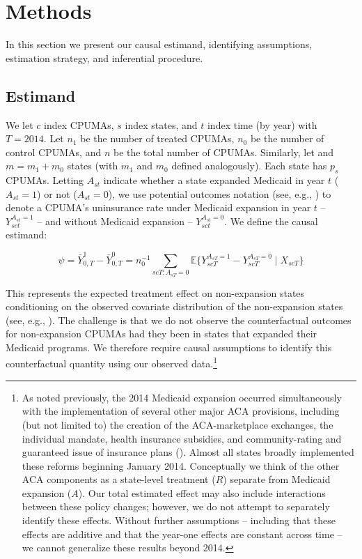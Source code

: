 \documentclass[aoas]{imsart}
\theoremstyle{plain}
\theoremstyle{remark}
\begin{document}
\section{Methods}\label{sec:methods}

In this section we present our causal estimand, identifying assumptions, estimation strategy, and inferential procedure.

\subsection{Estimand} \label{ssec:estimand}

We let $c$ index CPUMAs, $s$ index states, and $t$ index time (by year) with $T = 2014$. Let $n_1$ be the number of treated CPUMAs, $n_0$ be the number of control CPUMAs, and $n$ be the total number of CPUMAs. Similarly, let and $m = m_1 + m_0$ states (with $m_1$ and $m_0$ defined analogously). Each state has $p_s$ CPUMAs. Letting $A_{st}$ indicate whether a state expanded Medicaid in year $t$ ($A_{st} = 1$) or not ($A_{st} = 0$), we use potential outcomes notation (see, e.g., \cite{rubin2005causal}) to denote a CPUMA's uninsurance rate under Medicaid expansion in year $t$ -- $Y_{sct}^{A_{st} = 1}$ -- and without Medicaid expansion -- $Y_{sct}^{A_{st} = 0}$. We define the causal estimand:

\begin{equation}
\psi = \bar{Y}_{0, T}^1 - \bar{Y}_{0, T}^0 = n_0^{-1}\sum_{scT: A_{sT} = 0} \mathbb{E}\{Y_{scT}^{A_{sT} = 1} - Y_{scT}^{A_{sT} = 0} \mid X_{scT}\}
\end{equation}

This represents the expected treatment effect on non-expansion states conditioning on the observed covariate distribution of the non-expansion states (see, e.g., \cite{imbens2004nonparametric}). The challenge is that we do not observe the counterfactual outcomes for non-expansion CPUMAs had they been in states that expanded their Medicaid programs. We therefore require causal assumptions to identify this counterfactual quantity using our observed data.\footnote{As noted previously, the 2014 Medicaid expansion occurred simultaneously with the implementation of several other major ACA provisions, including (but not limited to) the creation of the ACA-marketplace exchanges, the individual mandate, health insurance subsidies, and community-rating and guaranteed issue of insurance plans (\cite{courtemanche2017early}). Almost all states broadly implemented these reforms beginning January 2014. Conceptually we think of the other ACA components as a state-level treatment ($R$) separate from Medicaid expansion ($A$). Our total estimated effect may also include interactions between these policy changes; however, we do not attempt to separately identify these effects. Without further assumptions -- including that these effects are additive and that the year-one effects are constant across time -- we cannot generalize these results beyond 2014.} 
\end{document}
